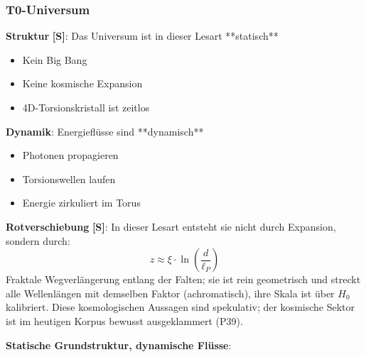 	\subsubsection{T0-Universum}

	\textbf{Struktur} \textbf{[S]}: Das Universum ist in dieser Lesart **statisch**
	\begin{itemize}
		\item Kein Big Bang
		\item Keine kosmische Expansion
		\item 4D-Torsionskristall ist zeitlos
	\end{itemize}

	\textbf{Dynamik}: Energieflüsse sind **dynamisch**
	\begin{itemize}
		\item Photonen propagieren
		\item Torsionswellen laufen
		\item Energie zirkuliert im Torus
	\end{itemize}

	\textbf{Rotverschiebung} \textbf{[S]}: In dieser Lesart entsteht sie nicht durch Expansion, sondern durch:
	\begin{equation}
		z \approx \xi \cdot \ln\left(\frac{d}{\ell_P}\right)
	\end{equation}
	Fraktale Wegverlängerung entlang der Falten; sie ist rein geometrisch und streckt alle Wellenlängen mit demselben Faktor (achromatisch), ihre Skala ist über $H_0$ kalibriert. Diese kosmologischen Aussagen sind spekulativ; der kosmische Sektor ist im heutigen Korpus bewusst ausgeklammert (P39).

	\begin{keyresult}
		\textbf{Statische Grundstruktur, dynamische Flüsse}:

		\vspace{0.3cm}

		\begin{center}
		\end{center}
	\end{keyresult}


